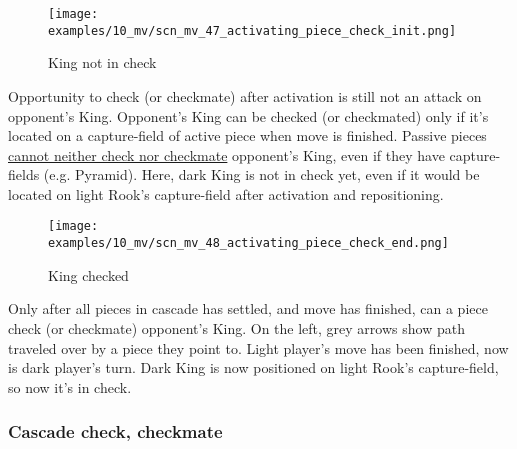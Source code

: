 \vspace*{-0.7\baselineskip}
\noindent
\begin{wrapfigure}[15]{l}{0.4\textwidth}
\centering
\texttt{[image: examples/10\_mv/scn\_mv\_47\_activating\_piece\_check\_init.png]}
\vspace*{-1.4\baselineskip}
\caption{King not in check}
\label{fig:scn_mv_47_activating_piece_check_init}
\end{wrapfigure}
Opportunity to check (or checkmate) after activation is still not
an attack on opponent's King. \newline
\indent
Opponent's King can be checked (or checkmated) only if it's located
on a capture-field of active piece when move is finished. \newline
\indent
Passive pieces
\hyperref[fig:scn_ma_19_pyramid_vs_king]{cannot neither check nor checkmate}
opponent's King, even if they have capture-fields (e.g. Pyramid). \newline
\indent
Here, dark King is not in check yet, even if it would be located on light
Rook's capture-field after activation and repositioning.

\noindent
\begin{wrapfigure}[11]{l}{0.4\textwidth}
\centering
\texttt{[image: examples/10\_mv/scn\_mv\_48\_activating\_piece\_check\_end.png]}
\vspace*{-1.4\baselineskip}
\caption{King checked}
\label{fig:scn_mv_48_activating_piece_check_end}
\end{wrapfigure}
Only after all pieces in cascade has settled, and move has finished, can a piece
check (or checkmate) opponent's King. \newline
\indent
On the left, grey arrows show path traveled over by a piece they point to.
Light player's move has been finished, now is dark player's turn. Dark King
is now positioned on light Rook's capture-field, so now it's in check.

\clearpage %

\subsubsection*{Cascade check, checkmate}
\label{sec:Miranda's veil/Wave/Cascading Waves/Cascade check, checkmate}

